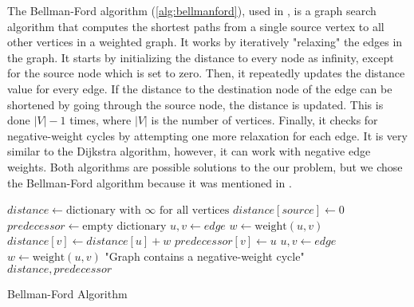 The Bellman-Ford algorithm (\ref{alg:bellmanford}), used in \texttt{}, 
is a graph search algorithm that computes 
the shortest paths from a single source vertex to all other vertices in a weighted graph.
It works by iteratively "relaxing" the edges in the graph. 
It starts by initializing the distance to every node as infinity, except for the source node which is set to zero. 
Then, it repeatedly updates the distance value for every edge. 
If the distance to the destination node of the edge can be shortened by going through the source node, the distance is updated. 
This is done $|V|-1$ times, where $|V|$ is the number of vertices. 
Finally, it checks for negative-weight cycles by attempting one more relaxation for each edge.
It is very similar to the Dijkstra algorithm, however, it can work with negative edge weights.
Both algorithms are possible solutions to the our problem, but we chose the Bellman-Ford algorithm because it was mentioned in \cite{threat_surf}.

\begin{algorithm}[h]
    
    \label{alg:bellmanford}
    \begin{algorithmic}[1]
        \State $distance \gets \text{dictionary with } \infty \text{ for all vertices}$
        \State $distance[source] \gets 0$
        \State $predecessor \gets \text{empty dictionary}$
                \State $u, v \gets edge$
                \State $w \gets \text{weight}(u, v)$
                    \State $distance[v] \gets distance[u] + w$
                    \State $predecessor[v] \gets u$
                \EndIf
            \EndFor
        \EndFor
            \State $u, v \gets edge$
            \State $w \gets \text{weight}(u, v)$
                \State \Return "Graph contains a negative-weight cycle"
            \EndIf
        \EndFor
        \State \Return $distance, predecessor$
    \EndProcedure
    \caption{Bellman-Ford Algorithm}
    \end{algorithmic}
\end{algorithm}